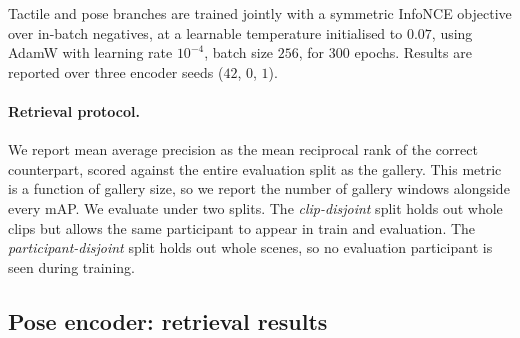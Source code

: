 Tactile and pose branches are trained jointly with a symmetric InfoNCE
objective over in-batch negatives, at a learnable temperature initialised to
$0.07$,
using AdamW with learning rate $10^{-4}$, batch size $256$,
for $300$ epochs. Results are reported over three encoder seeds
($42$, $0$, $1$).

\paragraph{Retrieval protocol.}
We report mean average precision as the mean reciprocal rank of the correct
counterpart, scored against the entire evaluation split as the gallery.
This metric is a function of gallery size, so we report the number of gallery
windows alongside every mAP. We evaluate under two splits. The
\emph{clip-disjoint} split holds out whole clips but allows the same
participant to appear in train and evaluation. The
\emph{participant-disjoint} split holds out whole scenes, so no evaluation
participant is seen during training.


\subsection{Pose encoder: retrieval results}
\label{app:retrieval}

